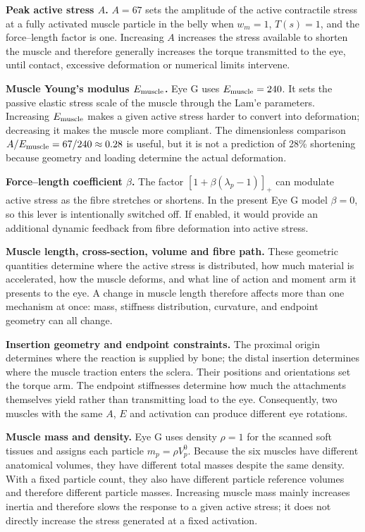 \documentclass[11pt]{article}
\begin{document}
\textbf{Peak active stress $A$.} $A=67$ sets the amplitude of the active contractile stress at a fully activated muscle particle in the belly when $w_m=1$, $T(s)=1$, and the force--length factor is one. Increasing $A$ increases the stress available to shorten the muscle and therefore generally increases the torque transmitted to the eye, until contact, excessive deformation or numerical limits intervene.

\textbf{Muscle Young's modulus $E_{\rm muscle}$.} Eye G uses $E_{\rm muscle}=240$. It sets the passive elastic stress scale of the muscle through the Lam'e parameters. Increasing $E_{\rm muscle}$ makes a given active stress harder to convert into deformation; decreasing it makes the muscle more compliant. The dimensionless comparison $A/E_{\rm muscle}=67/240\approx0.28$ is useful, but it is not a prediction of 28\% shortening because geometry and loading determine the actual deformation.

\textbf{Force--length coefficient $\beta$.} The factor $[1+\beta(\lambda_p-1)]_+$ can modulate active stress as the fibre stretches or shortens. In the present Eye G model $\beta=0$, so this lever is intentionally switched off. If enabled, it would provide an additional dynamic feedback from fibre deformation into active stress.

\textbf{Muscle length, cross-section, volume and fibre path.} These geometric quantities determine where the active stress is distributed, how much material is accelerated, how the muscle deforms, and what line of action and moment arm it presents to the eye. A change in muscle length therefore affects more than one mechanism at once: mass, stiffness distribution, curvature, and endpoint geometry can all change.

\textbf{Insertion geometry and endpoint constraints.} The proximal origin determines where the reaction is supplied by bone; the distal insertion determines where the muscle traction enters the sclera. Their positions and orientations set the torque arm. The endpoint stiffnesses determine how much the attachments themselves yield rather than transmitting load to the eye. Consequently, two muscles with the same $A$, $E$ and activation can produce different eye rotations.

\textbf{Muscle mass and density.} Eye G uses density $\rho=1$ for the scanned soft tissues and assigns each particle $m_p=\rho V_p^0$. Because the six muscles have different anatomical volumes, they have different total masses despite the same density. With a fixed particle count, they also have different particle reference volumes and therefore different particle masses. Increasing muscle mass mainly increases inertia and therefore slows the response to a given active stress; it does not directly increase the stress generated at a fixed activation.
\end{document}
